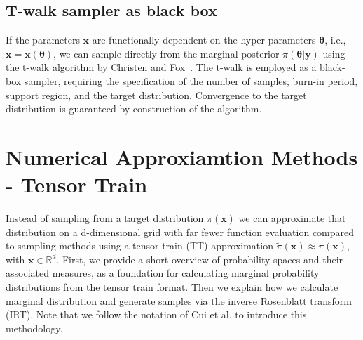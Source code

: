 \subsection{T-walk sampler as black box}
If the parameters $\bm{x}$ are functionally dependent on the hyper-parameters $\bm{\theta}$, i.e., $\bm{x} = \bm{x}(\bm{\theta})$, we can sample directly from the marginal posterior $\pi(\bm{\theta} | \bm{y})$ using the t-walk algorithm by Christen and Fox~\cite{christen2010general}. 
The t-walk is employed as a black-box sampler, requiring the specification of the number of samples, burn-in period, support region, and the target distribution. 
Convergence to the target distribution is guaranteed by construction of the algorithm.

\section{Numerical Approxiamtion Methods - Tensor Train}
\label{sec:tensortrain}
Instead of sampling from a target distribution $\pi(\bm{x})$ we can approximate that distribution on a d-dimensional grid with far fewer function evaluation compared to sampling methods using a tensor train (TT) approximation $\tilde{\pi}(\bm{x}) \approx \pi(\bm{x})$, with  $\bm{x}\in \mathbb{R}^d$.
First, we provide a short overview of probability spaces and their associated measures, as a foundation for calculating marginal probability distributions from the tensor train format.
Then we explain how we calculate marginal distribution and generate samples via the inverse Rosenblatt transform (IRT).
Note that we follow the notation of Cui et al. \cite{cui2022deep} to introduce this methodology.

